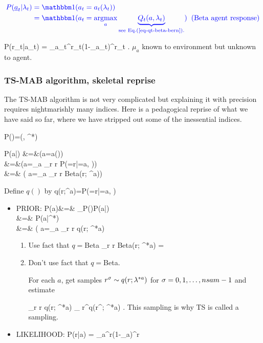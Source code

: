 \begin{align}\color{blue}
P(\rva_t|\lam_t)
&\color{blue}= \indi( a_t=a_t(\lam_t))
\\
&\color{blue}= \indi( a_t=\argmax_a
\underbrace{ Q_t(a, \lam_t)}_
{\text{see Eq.(\ref{eq-qt-beta-bern}).}}
)
\;\;\text{(Beta agent response)}
\end{align}

\beq\color{blue}
P(r_t|a_t) =
\mu_{a_t}^{r_t}(1-\mu_{a_t})^{r_t}
\;\;
\;.
\eeq
$\mu_a$ known to environment
but unknown to agent.

\subsubsection{TS-MAB 
algorithm, skeletal reprise}

The TS-MAB algorithm
is not very 
complicated but explaining
it with precision
requires nightmarishly many
indices.
Here is a pedagogical reprise
of what we have said so far,
where we have 
stripped out some of the
inessential indices.




\beq
P(\lam)=\indi(\lam, \lam^*)
\eeq

\beqa
P(a|\lam)
&=&\indi(a=a(\lam))
\\
&=&\indi(a=\argmax_a \sum_r r P(=r|=a, \lam))
\\
&=& \indi( a=\argmax_a \sum_r r {\rm Beta}(r; \lam^a))
\;\;
\eeqa

Define $q()$ by
\beq
q(r;\lam^a)=P(=r|=a, \lam)
\eeq

\begin{itemize}
\item PRIOR:
\beqa
P(a)&=&
\sum_\lam P(\lam)P(a|\lam)
\\
&=&
P(a|\lam^*)
\\
&=&
\indi( a=\argmax_a
 \sum_r r q(r; \lam^{*a})
\eeqa


\begin{enumerate}
\item Use fact that $q=$Beta
\beq
\sum_r r {\rm Beta}(r; \lam^{*a})
=
\eeq

\item Don't use fact that $q=$Beta.

 For each $a$,
get samples $r^\sigma \sim
q(r; \lambda^{*a})$
for $\sigma=0, 1, \ldots, nsam-1$
and estimate

\beq
\sum_r r q(r; \lam^{*a})
\approx
{}\sum_\s
r^\s q(r^\s; \lam^{*a})
\;.
\eeq
This sampling is why TS is called a sampling.
\end{enumerate}


\item LIKELIHOOD:
\beq
P(r|a) =
\mu_{a}^{r}(1-\mu_{a})^{r}
\;\;
\eeq
\end{itemize}



